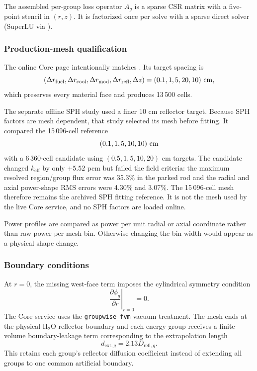 \documentclass[11pt]{article}
\begin{document}
The assembled per-group loss operator $A_g$ is a sparse CSR matrix with a
five-point stencil in $(r,z)$.  It is factorized once per solve with a sparse
direct solver (SuperLU via ).

\subsubsection{Production-mesh qualification}

The online Core page intentionally matches
.  Its target spacing is
\[
(\Delta r_{\mathrm{fuel}},\Delta r_{\mathrm{cool}},
 \Delta r_{\mathrm{mod}},\Delta r_{\mathrm{refl}},\Delta z)
=(0.1,1,5,20,10)\ {\rm cm},
\]
which preserves every material face and produces 13\,500 cells.

The separate offline SPH study used a finer 10 cm reflector target.  Because
SPH factors are mesh dependent, that study selected its mesh before fitting.
It compared the 15\,096-cell reference
\[
(0.1,1,5,10,10)\ {\rm cm}
\]
with a 6\,360-cell candidate using $(0.5,1,5,10,20)$ cm targets.  The candidate
changed $k_{\mathrm{eff}}$ by only $+5.52$ pcm but failed the field criteria:
the maximum resolved region/group flux error was 35.3\% in the parked rod and
the radial and axial power-shape RMS errors were 4.30\% and 3.07\%.  The
15\,096-cell mesh therefore remains the archived SPH fitting reference.  It is
not the mesh used by the live Core service, and no SPH factors are loaded
online.

Power profiles are compared as power per unit radial or axial coordinate
rather than raw power per mesh bin.  Otherwise changing the bin width would
appear as a physical shape change.

\subsubsection{Boundary conditions}

At $r=0$, the missing west-face term imposes the cylindrical symmetry
condition
\[
\left.\frac{\partial\phi_g}{\partial r}\right|_{r=0}=0 .
\]
The Core service uses the \texttt{groupwise\_fvm} vacuum treatment.  The mesh
ends at the physical H$_2$O reflector boundary and each energy group receives a
finite-volume boundary-leakage term corresponding to the extrapolation length
\[
d_{\mathrm{ext},g}=2.13D_{\mathrm{refl},g}.
\]
This retains each group's reflector diffusion coefficient instead of extending
all groups to one common artificial boundary.
\end{document}
